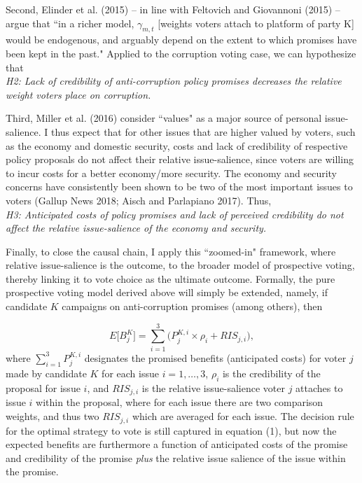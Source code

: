 \documentclass[11pt]{article}
\begin{document}
Second, Elinder et al. (2015) -- in line with Feltovich and Giovannoni (2015) -- argue that “in a richer model, $\gamma_{m, t}$ [weights voters attach to platform of party K] would be endogenous, and arguably depend on the extent to which promises have been kept in the past." Applied to the corruption voting case, we can hypothesize that \\
\textit{H2: Lack of credibility of anti-corruption policy promises decreases the relative weight voters place on corruption.}

Third, Miller et al. (2016) consider “values" as a major source of personal issue-salience. I thus expect that for other issues that are higher valued by voters, such as the economy and domestic security, costs and lack of credibility of respective policy proposals do not affect their relative issue-salience, since voters are willing to incur costs for a better economy/more security. The economy and security concerns have consistently been shown to be two of the most important issues to voters (Gallup News 2018; Aisch and Parlapiano 2017). Thus, \\
\textit{H3: Anticipated costs of policy promises and lack of perceived credibility do not affect the relative issue-salience of the economy and security.}

Finally, to close the causal chain, I apply this “zoomed-in" framework, where relative issue-salience is the outcome, to the broader model of prospective voting, thereby linking it to vote choice as the ultimate outcome. Formally, the pure prospective voting model derived above will simply be extended, namely, if candidate $K$ campaigns on anti-corruption promises (among others), then

\begin{equation}
E\Big[B_j^K\Big] = \sum_{i = 1}^{3}\bigg(P_j^{K, i} \times \rho_i + RIS_{j,i}\bigg),
\end{equation}
where $\sum_{i = 1}^{3}P_j^{K, i}$ designates the promised benefits (anticipated costs) for voter $j$ made by candidate $K$ for each issue $i = 1, \hdots, 3$, $\rho_i$ is the credibility of the proposal for issue $i$, and $RIS_{j,i}$ is the relative issue-salience voter $j$ attaches to issue $i$ within the proposal, where for each issue there are two comparison weights, and thus two $RIS_{j,i}$ which are averaged for each issue. The decision rule for the optimal strategy to vote is still captured in equation (1), but now the expected benefits are furthermore a function of anticipated costs of the promise and credibility of the promise \textit{plus} the relative issue salience of the issue within the promise.
\end{document}
